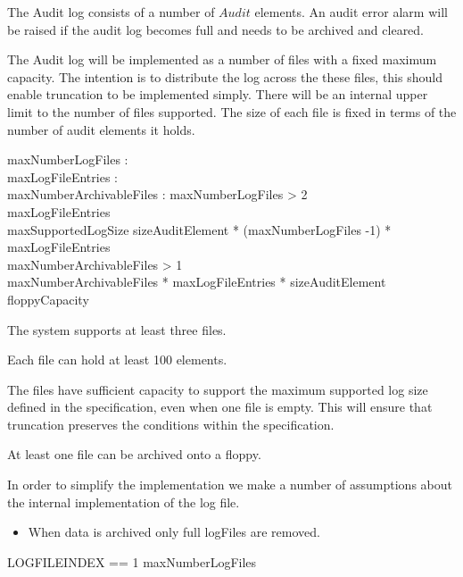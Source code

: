 The Audit log consists of a number of $Audit$ elements. 
An audit error alarm will be raised if the audit log becomes full and
needs to be archived and cleared.

The Audit log will be implemented as a number of files with a fixed
maximum capacity. 
The intention is to distribute the log across the these files, this should
enable truncation to be implemented simply. 
There will be an internal upper limit to the number of files
supported. The size of each file is fixed in terms of the number of
audit elements it holds.

\begin{axdef}
        maxNumberLogFiles : \nat
\\      maxLogFileEntries : \nat
\\      maxNumberArchivableFiles : \nat
\where
        maxNumberLogFiles > 2
\\      maxLogFileEntries 
\\      maxSupportedLogSize \leq sizeAuditElement * (maxNumberLogFiles -1)
* maxLogFileEntries
\\      maxNumberArchivableFiles > 1
\\      maxNumberArchivableFiles * maxLogFileEntries *
sizeAuditElement \leq floppyCapacity
\end{axdef}
\begin{Zcomment}
\item
The system supports at least three files.
\item
Each file can hold at least 100 elements.
\item 
The files have sufficient capacity to support the maximum supported
log size defined in the specification, even when one file is empty. 
This will ensure that truncation preserves the conditions within the
specification. 
\item
At least one file can be archived onto a floppy.
\end{Zcomment}

In order to simplify the implementation we make a number of
assumptions about the internal implementation of the log file.
\begin{itemize}
\item
When data is archived only full logFiles are removed.
\end{itemize}


\begin{zed}
        LOGFILEINDEX == 1 \upto maxNumberLogFiles
\end{zed}        


